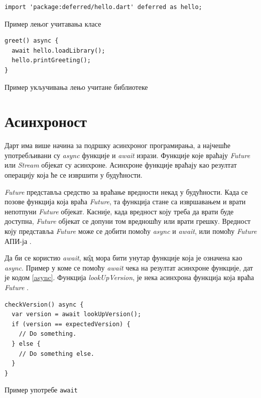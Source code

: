 \documentclass[12pt,oneside]{memoir}
\begin{document}
\begin{listing}
\begin{verbatim}
import 'package:deferred/hello.dart' deferred as hello;
\end{verbatim}
\caption{Пример лењог учитавања класе}
\label{lazy1}
\end{listing}

\begin{listing}
\begin{verbatim}
greet() async {
  await hello.loadLibrary();
  hello.printGreeting();
}
\end{verbatim}
\caption{Пример укључивања лењо учитане библиотеке}
\label{lazy2}
\end{listing}

\section{Асинхроност}
\label{asinhronost}
Дарт има више начина за подршку асинхроног програмирања, а најчешће употребљивани су \textit{async} функције и \textit{await} изрази. Функције које враћају \textit{Future} или \textit{Stream} објекат су асинхроне. Асинхроне функције враћају као резултат операцију која ће се извршити у будућности.

\textit{Future} представља средство за враћање вредности некад у будућности. Када се позове функција која враћа \textit{Future}, та функција стане са извршавањем и врати непотпуни \textit{Future} објекат. Касније, када вредност коју треба да врати буде доступна, \textit{Future} објекат се допуни том вредношћу или врати грешку. Вредност коју представља \textit{Future} може се добити помоћу \textit{async} и \textit{await}, или помоћу \textit{Future} АПИ-ја \cite{dart, dart1}. 

Да би се користио \textit{await}, к\^{о}д мора бити унутар функције која је означена као \textit{async}. Пример у коме се помоћу \textit{await} чека на резултат асинхроне функције, дат је кодом \ref{async}. Функција \textit{lookUpVersion}, је нека асинхрона функција која враћа \textit{Future} \cite{dart, dart1}.

\begin{listing}
\begin{verbatim}
checkVersion() async {
  var version = await lookUpVersion();
  if (version == expectedVersion) {
    // Do something.
  } else {
    // Do something else.
  }
}
\end{verbatim}
\caption{Пример употребе \texttt{await}}
\label{async}
\end{listing}
\end{document}
